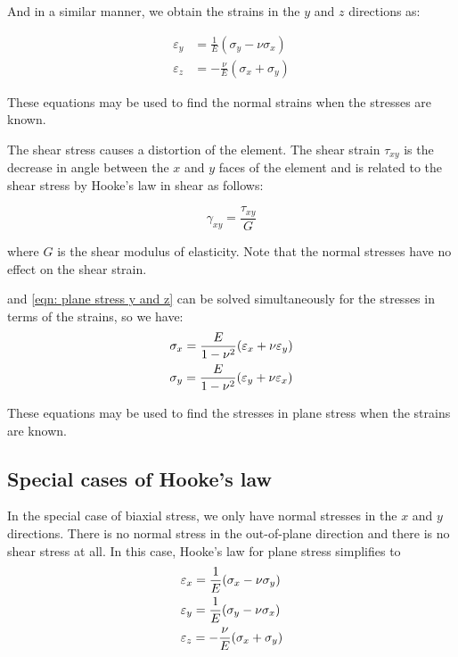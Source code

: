 \documentclass[
10pt,
a4paper,
openany,
svgnames,
]{kaobook} %
\begin{document}
And in a similar manner, we obtain the strains in the $y$ and $z$ directions as:

\begin{align} \label{eqn: plane stress y and z}
  \varepsilon_y &= \frac{1}{E}(\sigma_y - \nu \sigma_x) \nonumber \\
  \varepsilon_z &=  - \frac{\nu }{E}(\sigma_x + \sigma_y)
\end{align}

These equations may be used to find the normal strains when the stresses are known.

The shear stress causes a distortion of the element. The shear strain $\tau_{xy}$ is the decrease in angle between the $x$ and $y$ faces of the element and is related to the shear stress by Hooke’s law in shear as follows:

\begin{equation}
  \gamma_{xy} = \frac{\tau_{xy}}{G}
\end{equation}

where $G$ is the shear modulus of elasticity. Note that the normal stresses have no effect on the shear strain.

 and \cref{eqn: plane stress y and z} can be solved simultaneously for the stresses in terms of the strains, so we have:
\begin{equation}
  \begin{gathered}
    \sigma_x = \frac{E}{1 - \nu^2}(\varepsilon_x + \nu \varepsilon_y) \hfill \\
    \sigma_y = \frac{E}{1 - \nu^2}(\varepsilon_y + \nu \varepsilon_x) \hfill \\ 
  \end{gathered}
\end{equation}

These equations may be used to find the stresses in plane stress when the strains are known.

\subsection{Special cases of Hooke’s law}

In the special case of biaxial stress, we only have normal stresses in the $x$ and $y$ directions. There is no normal stress in the out-of-plane direction and there is no shear stress at all. In this case, Hooke’s law for plane stress simplifies to
\begin{equation}
  \begin{gathered}
    \varepsilon_x = \frac{1}{E}(\sigma_x - \nu \sigma_y) \hfill \\
    \varepsilon_y = \frac{1}{E}(\sigma_y - \nu \sigma_x) \hfill \\
    \varepsilon_z =  - \frac{\nu }{E}(\sigma_x + \sigma_y) \hfill \\ 
  \end{gathered}
\end{equation}
\end{document}
